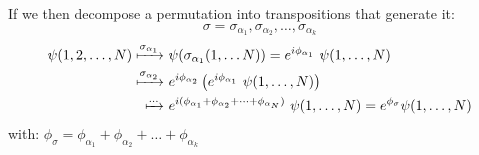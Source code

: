 If we then decompose a permutation into transpositions that generate it:
$$\sigma = \sigma_{\alpha_1}, \sigma_{\alpha_2}, \dots, \sigma_{\alpha_k} $$
\begin{equation*}
    \begin{aligned}
        \psi(1,2,\dots, N) \xmapsto{\sigma_{\alpha_1}}&\ \psi(\sigma_{\alpha_1}(1,\dots N)) = e^{i\phi_{\alpha_1}}\ \psi(1,\dots, N) \\
        \xmapsto{\sigma_{\alpha_2}}&\ e^{i\phi_{\alpha_2}} \left(e^{i\phi_{\alpha_1}}\ \psi(1,\dots, N)\right) \\
        \xmapsto{\dots}&\ e^{i(\phi_{\alpha_1} + \phi_{\alpha_2} + \dots + \phi_{\alpha_N})}\ \psi(1,\dots, N) = e^{\phi_\sigma}\psi(1,\dots, N)
    \end{aligned}
\end{equation*}
with: $\phi_\sigma = \phi_{\alpha_1} + \phi_{\alpha_2} + \dots + \phi_{\alpha_k}$

